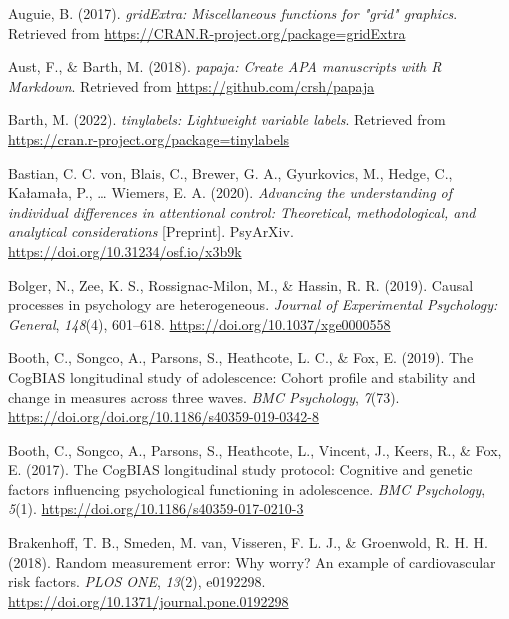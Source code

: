 \documentclass[
  man,floatsintext]{apa6}
\newlength{\cslhangindent}
\newlength{\cslentryspacingunit} %
\newenvironment{CSLReferences}[2] %
 {%
  \setlength{\parindent}{0pt}
  \ifodd #1
  \let\oldpar\par
  \def\par{\hangindent=\cslhangindent\oldpar}
  \fi
  \setlength{\parskip}{#2\cslentryspacingunit}
 }%
 {}
\begin{document}
\hypertarget{refs}{}
\begin{CSLReferences}{1}{0}
\leavevmode{}%
Auguie, B. (2017). \emph{gridExtra: Miscellaneous functions for "grid" graphics}. Retrieved from \url{https://CRAN.R-project.org/package=gridExtra}

\leavevmode{}%
Aust, F., \& Barth, M. (2018). \emph{{papaja}: {Create} {APA} manuscripts with {R Markdown}}. Retrieved from \url{https://github.com/crsh/papaja}

\leavevmode{}%
Barth, M. (2022). \emph{{tinylabels}: Lightweight variable labels}. Retrieved from \url{https://cran.r-project.org/package=tinylabels}

\leavevmode{}%
Bastian, C. C. von, Blais, C., Brewer, G. A., Gyurkovics, M., Hedge, C., Kałamała, P., \ldots{} Wiemers, E. A. (2020). \emph{Advancing the understanding of individual differences in attentional control: {Theoretical}, methodological, and analytical considerations} {[}Preprint{]}. PsyArXiv. \url{https://doi.org/10.31234/osf.io/x3b9k}

\leavevmode{}%
Bolger, N., Zee, K. S., Rossignac-Milon, M., \& Hassin, R. R. (2019). Causal processes in psychology are heterogeneous. \emph{Journal of Experimental Psychology: General}, \emph{148}(4), 601--618. \url{https://doi.org/10.1037/xge0000558}

\leavevmode{}%
Booth, C., Songco, A., Parsons, S., Heathcote, L. C., \& Fox, E. (2019). The {CogBIAS} longitudinal study of adolescence: {Cohort} profile and stability and change in measures across three waves. \emph{BMC Psychology}, \emph{7}(73). \url{https://doi.org/doi.org/10.1186/s40359-019-0342-8}

\leavevmode{}%
Booth, C., Songco, A., Parsons, S., Heathcote, L., Vincent, J., Keers, R., \& Fox, E. (2017). The {CogBIAS} longitudinal study protocol: Cognitive and genetic factors influencing psychological functioning in adolescence. \emph{BMC Psychology}, \emph{5}(1). \url{https://doi.org/10.1186/s40359-017-0210-3}

\leavevmode{}%
Brakenhoff, T. B., Smeden, M. van, Visseren, F. L. J., \& Groenwold, R. H. H. (2018). Random measurement error: {Why} worry? {An} example of cardiovascular risk factors. \emph{PLOS ONE}, \emph{13}(2), e0192298. \url{https://doi.org/10.1371/journal.pone.0192298}


\end{CSLReferences}
\end{document}
